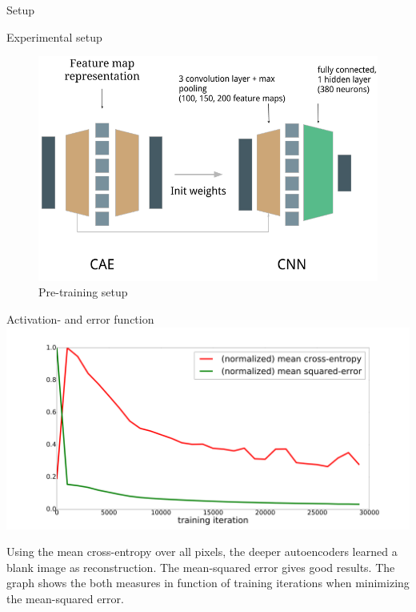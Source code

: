 \documentclass[final]{beamer}
\newlength{\onecolwid}
\begin{document}
\begin{frame}[t]
\begin{columns}[t]
\begin{column}{\onecolwid}
\begin{alertblock}{Setup}
\begin{block}{Experimental setup}
\begin{figure}
\includegraphics[width=0.8\linewidth]{graphics/setup.png}
\caption{Pre-training setup}
\end{figure}

\end{block}

\end{alertblock}


\begin{alertblock}{Activation- and error function}
	\centering
	\includegraphics[width=.7\linewidth]{graphics/mse_ce_comparison.png}

	Using the mean cross-entropy over all pixels, the deeper autoencoders learned a blank image as reconstruction. The mean-squared error gives good results. The graph shows the both measures in function of training iterations when minimizing the mean-squared error. 

\end{alertblock}



\end{column}
\end{columns}
\end{frame}
\end{document}
